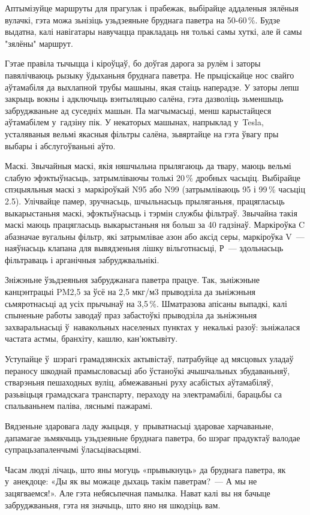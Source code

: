 Аптымізуйце маршруты для прагулак і прабежак, выбірайце аддаленыя зялёныя вулачкі, гэта можа зьнізіць узьдзеяньне бруднага паветра на 50-60\,\%. Будзе выдатна, калі навігатары навучацца пракладаць ня толькі самы хуткі, але й самы "зялёны" маршрут.

Гэтае правіла тычыцца і кіроўцаў, бо доўгая дарога за рулём і заторы павялічваюць рызыку ўдыханьня бруднага паветра. Не прыціскайце нос свайго аўтамабіля да выхлапной трубы машыны, якая стаіць наперадзе. У заторы лепш закрыць вокны і адключыць вэнтыляцыю салёна, гэта дазволіць зьменшыць забруджваньне ад суседніх машын. Па магчымасьці, менш карыстайцеся аўтамабілем у~гадзіну пік. У некаторых машынах, напрыклад у~Tesla, усталяваныя вельмі якасныя фільтры салёна, зьвяртайце на гэта ўвагу пры выбары і абслугоўваньні аўто.

Маскі. Звычайныя маскі, якія няшчыльна прылягаюць да твару, маюць вельмі слабую эфэктыўнасьць, затрымліваючы толькі 20\,\% дробных часьціц. Выбірайце спэцыяльныя маскі з~маркіроўкай N95 або N99 (затрымліваюць 95 і 99\,\% часьціц 2.5). Улічвайце памер, зручнасьць, шчыльнасьць прыляганьня, працягласьць выкарыстаньня маскі, эфэктыўнасьць і тэрмін службы фільтраў. Звычайна такія маскі маюць працягласьць выкарыстаньня ня больш за 40 гадзінаў. Маркіроўка C абазначае вугальны фільтр, які затрымлівае азон або аксід серы, маркіроўка V~--- наяўнасьць клапана для вывядзеньня лішку вільготнасьці, Р~--- здольнасьць фільтраваць і арганічныя забруджвальнікі.

Зніжэньне ўзьдзеяньня забруджанага паветра працуе. Так, зьніжэньне канцэнтрацыі PM2,5 за ўсё на 2,5 мкг/м3 прыводзіла да зьніжэньня сьмяротнасьці ад усіх прычынаў на 3,5\,\%. Шматразова апісаны выпадкі, калі спыненьне работы заводаў праз забастоўкі прыводзіла да зьніжэньня захваральнасьці ў~навакольных населеных пунктах у~некалькі разоў: зьніжалася частата астмы, бранхіту, кашлю, кан'юктывіту.

Уступайце ў~шэрагі грамадзянскіх актывістаў, патрабуйце ад мясцовых уладаў пераносу шкоднай прамысловасьці або ўстаноўкі ачышчальных збудаваньняў, стварэньня пешаходных вуліц, абмежаваньні руху асабістых аўтамабіляў, разьвіцьця грамадскага транспарту, пераходу на электрамабілі, барацьбы са спальваньнем паліва, ляснымі пажарамі.

Вядзеньне здаровага ладу жыцьця, у~прыватнасьці здаровае харчаваньне, дапамагае зьмякчыць узьдзеяньне бруднага паветра, бо шэраг прадуктаў валодае супрацьзапаленчымі ўласьцівасьцямі.

Часам людзі лічаць, што яны могуць «прывыкнуць» да бруднага паветра, як у~анекдоце: «Ды як вы можаце дыхаць такім паветрам?~--- А мы не зацягваемся!». Але гэта небясьпечная памылка. Нават калі вы ня бачыце забруджваньня, гэта ня значыць, што яно ня шкодзіць вам.

